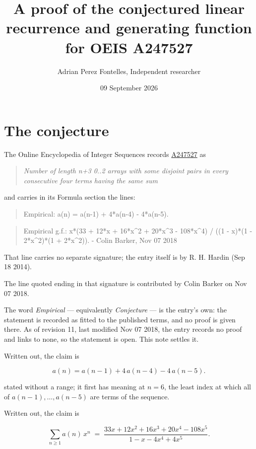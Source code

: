 \documentclass[11pt]{article}
\title{A proof of the conjectured linear recurrence and generating function for OEIS A247527}
\author{Adrian Perez Fontelles, Independent researcher}
\date{09 September 2026}
\theoremstyle{definition}
\begin{document}
\maketitle
\section{The conjecture}

The Online Encyclopedia of Integer Sequences records \href{https://oeis.org/A247527}{A247527} as

\begin{quote}\itshape Number of length n+3 0..2 arrays with some disjoint pairs in every consecutive four terms having the same sum\end{quote}

and carries in its Formula section the lines:

\begin{quote}\ttfamily Empirical: a(n) = a(n-1) + 4*a(n-4) - 4*a(n-5).\end{quote}

\begin{quote}\ttfamily Empirical g.f.: x*(33 + 12*x + 16*x\textasciicircum{}2 + 20*x\textasciicircum{}3 - 108*x\textasciicircum{}4) / ((1 - x)*(1 - 2*x\textasciicircum{}2)*(1 + 2*x\textasciicircum{}2)). - Colin Barker, Nov 07 2018\end{quote}

That line carries no separate signature; the entry itself is by R. H. Hardin (Sep 18 2014).

The line quoted ending in that signature is contributed by Colin Barker on Nov 07 2018.

The word {\itshape Empirical} --- equivalently {\itshape Conjecture} --- is the entry's own: the statement is recorded as fitted to the published terms, and no proof is given there. As of revision 11, last modified Nov 07 2018, the entry records no proof and links to none, so the statement is open. This note settles it.

Written out, the claim is

\[a(n) = a(n-1) + 4\,a(n-4) - 4\,a(n-5).\]

stated without a range; it first has meaning at $n = 6$, the least index at which all of $a(n-1),\dots,a(n-5)$ are terms of the sequence.

Written out, the claim is

\[\sum_{n \ge 1} a(n)\,x^n \;=\; \frac{33x + 12x^{2} + 16x^{3} + 20x^{4} - 108x^{5}}{1 - x - 4x^{4} + 4x^{5}}.\]
\end{document}

